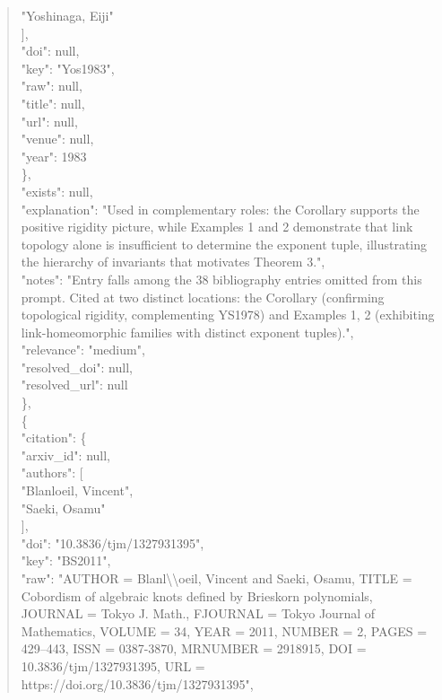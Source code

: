 \documentclass[11pt]{article}
\begin{document}
\begin{quote}
          "Yoshinaga, Eiji"\\
        ],\\
        "doi": null,\\
        "key": "Yos1983",\\
        "raw": null,\\
        "title": null,\\
        "url": null,\\
        "venue": null,\\
        "year": 1983\\
      \},\\
      "exists": null,\\
      "explanation": "Used in complementary roles: the Corollary supports the positive rigidity picture, while Examples 1 and 2 demonstrate that link topology alone is insufficient to determine the exponent tuple, illustrating the hierarchy of invariants that motivates Theorem 3.",\\
      "notes": "Entry falls among the 38 bibliography entries omitted from this prompt. Cited at two distinct locations: the Corollary (confirming topological rigidity, complementing YS1978) and Examples 1, 2 (exhibiting link-homeomorphic families with distinct exponent tuples).",\\
      "relevance": "medium",\\
      "resolved\_doi": null,\\
      "resolved\_url": null\\
    \},\\
    \{\\
      "citation": \{\\
        "arxiv\_id": null,\\
        "authors": [\\
          "Blanloeil, Vincent",\\
          "Saeki, Osamu"\\
        ],\\
        "doi": "10.3836/tjm/1327931395",\\
        "key": "BS2011",\\
        "raw": "AUTHOR = Blanl\textbackslash{}\textbackslash{}oeil, Vincent and Saeki, Osamu, TITLE = Cobordism of algebraic knots defined by Brieskorn polynomials, JOURNAL = Tokyo J. Math., FJOURNAL = Tokyo Journal of Mathematics, VOLUME = 34, YEAR = 2011, NUMBER = 2, PAGES = 429--443, ISSN = 0387-3870, MRNUMBER = 2918915, DOI = 10.3836/tjm/1327931395, URL = https://doi.org/10.3836/tjm/1327931395",\\

\end{quote}
\end{document}
